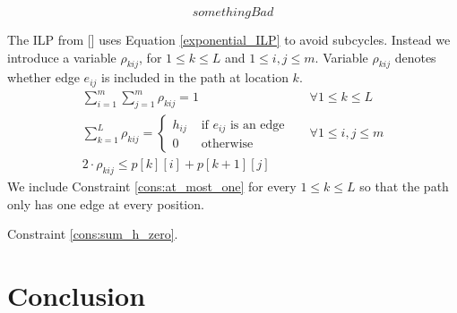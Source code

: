\documentclass[sigconf,natbib=false]{acmart}
\begin{document}
\begin{equation}
  something Bad
  \label{exponential_ILP}
\end{equation}

The ILP from [] uses Equation \ref{exponential_ILP} to avoid subcycles. Instead we introduce a variable $\rho_{kij}$, for $1 \leq k \leq L$ and $1 \leq i, j \leq m$. Variable $\rho_{kij}$ denotes whether edge $e_{ij}$ is included in the path at location $k$.
\begin{align}
  \sum_{i=1}^m \sum_{j=1}^m \rho_{kij} = 1 &&\forall 1 \leq k \leq L \label{cons:at_most_one}\\
  \sum_{k=1}^L \rho_{kij} = \begin{cases} h_{ij} &\text{ if } e_{ij} \text{ is an edge} \\
    0 &\text{ otherwise}
  \end{cases} && \forall 1 \leq i, j \leq m \label{cons:sum_h_zero}\\
  2 \cdot \rho_{kij} \leq p[k][i] + p[k+1][j]
\end{align}
We include Constraint \ref{cons:at_most_one} for every $1 \leq k \leq L$ so that the path only has one edge at every position.

Constraint \ref{cons:sum_h_zero}.

\section{Conclusion}



\end{document}
